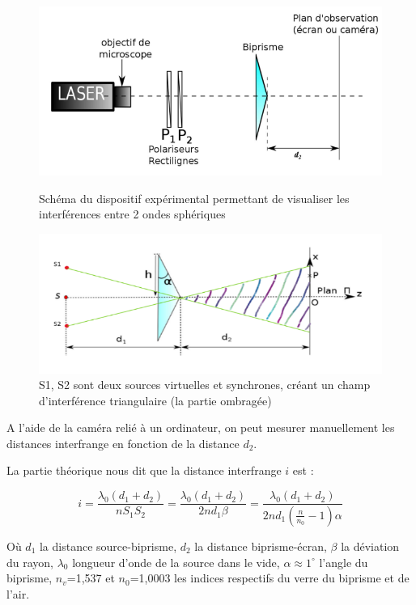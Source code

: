 \documentclass[11pt, a4paper]{article}
\begin{document}
\begin{figure}[htbp]
    \centering
    \begin{minipage}[t]{0.48\textwidth}
        \centering
        \includegraphics[width=\textwidth]{montage1.png}
        \caption{Schéma du dispositif expérimental permettant de visualiser les interférences entre 2 ondes sphériques}
        \label{montage1}
    \end{minipage}
    \hfill
    \begin{minipage}[t]{0.48\textwidth}
        \centering
        \includegraphics[width=\textwidth]{champs1.png}
        \caption{S1, S2 sont deux sources virtuelles et synchrones, créant un champ d'interférence triangulaire (la partie ombragée)}
        \label{champs1}
    \end{minipage}
\end{figure}
  

A l'aide de la caméra relié à un ordinateur, on peut mesurer manuellement les distances interfrange en fonction de la distance $d_2$.

La partie théorique nous dit que la distance interfrange $i$ est :

$$
    i = \frac{\lambda_0( {d_1 + d_2} )}{nS_1S_2} = \frac{\lambda_0( {d_1 + d_2} )}{2nd_1\beta} = \frac{\lambda_0( {d_1 + d_2} )}{2nd_1\left(\frac{n}{n_0}-1\right)\alpha}
$$

Où $d_1$ la distance source-biprisme, $d_2$ la distance biprisme-écran, $\beta$ la déviation du rayon, $\lambda_0$ longueur d'onde de la source dans le vide, $\alpha\approx1^{\circ}$ l'angle du biprisme, $n_v$=1,537 et $n_0$=1,0003 les indices respectifs du verre du biprisme et de l'air.
\end{document}
